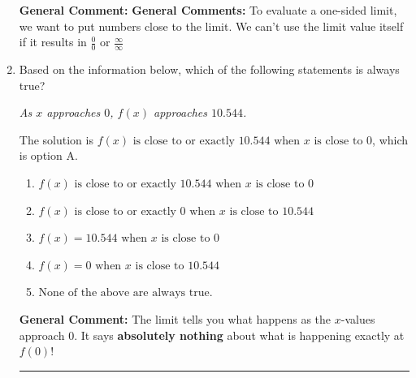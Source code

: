\documentclass{extbook}[14pt]
\newcommand{\litem}[1]{\item #1

\rule{\textwidth}{0.4pt}}
\begin{document}
\begin{enumerate}
{\textbf{General Comment:} \textbf{General Comments:} To evaluate a one-sided limit, we want to put numbers close to the limit. We can't use the limit value itself if it results in $\frac{0}{0}$ or $\frac{\infty}{\infty}$
}
\litem{
Based on the information below, which of the following statements is always true?

\begin{center}
    \textit{ As $x$ approaches $0$, $f(x)$ approaches $10.544$. }
\end{center}
The solution is \( f(x) \text{ is close to or exactly } 10.544 \text{ when } x \text{ is close to } 0 \), which is option A.\begin{enumerate}[label=\Alph*.]
\item \( f(x) \text{ is close to or exactly } 10.544 \text{ when } x \text{ is close to } 0 \)


\item \( f(x) \text{ is close to or exactly } 0 \text{ when } x \text{ is close to } 10.544 \)


\item \( f(x) = 10.544 \text{ when } x \text{ is close to } 0 \)


\item \( f(x) = 0 \text{ when } x \text{ is close to } 10.544 \)


\item \( \text{None of the above are always true.} \)


\end{enumerate}

\textbf{General Comment:} The limit tells you what happens as the $x$-values approach $0$. It says \textbf{absolutely nothing} about what is happening exactly at $f(0)$!
}
\end{enumerate}
\end{document}
